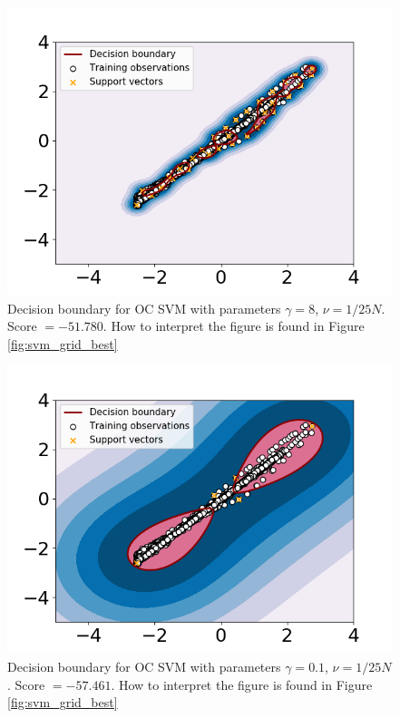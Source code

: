     \begin{figure}
        \centering
        \includegraphics[width = .7\textwidth]{report/figures/analysis/gridsearch/Novelty detection, -4 training, gamma = 8 nu = 4.233252195999577e-06.png}
        \caption{Decision boundary for OC SVM with parameters $\gamma = 8$, $\nu = 1/25N$. Score $=-51.780$. How to interpret the figure is found in Figure \ref{fig:svm_grid_best}}
        \label{fig:my_label}
    \end{figure}
    
    \begin{figure}
        \centering
        \includegraphics[width = .7\textwidth]{report/figures/analysis/gridsearch/Novelty detection, -3 training, gamma = 0.1 nu = 4.233252195999577e-06.png}
        \caption{Decision boundary for OC SVM with parameters $\gamma = 0.1$, $\nu = 1/25N$. Score $=-57.461$. How to interpret the figure is found in Figure \ref{fig:svm_grid_best}}
        \label{fig:my_label}
    \end{figure}
    
